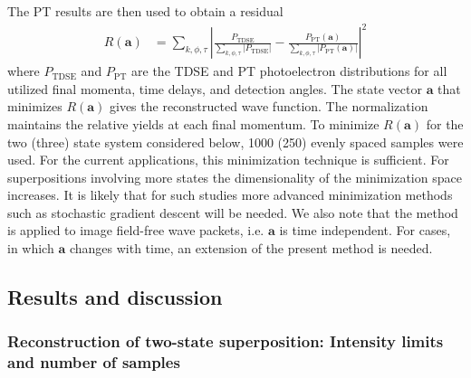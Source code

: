 The PT results are then used to obtain a residual 
%
\begin{align}
   R(\mathbf{a}) &=
   \sum_{k,\phi,\tau} \left|\frac{P_\text{TDSE}}{\sum\limits_{k,\phi,\tau}|P_\text{TDSE}|}-\frac{P_\text{PT}(\mathbf{a})}{\sum\limits_{k,\phi,\tau}|P_\text{PT}(\mathbf{a})|}\right|^2
   \label{eqn:residual}
\end{align}
%
where $P_\text{TDSE}$ and $P_\text{PT}$ are the TDSE and PT photoelectron distributions for all utilized final momenta, time delays, and detection angles. The state vector $\mathbf{a}$ that minimizes $R(\mathbf{a})$ gives the reconstructed wave function. The normalization maintains the relative yields at each final momentum. To minimize $R(\mathbf{a})$ for the two (three) state system considered below, 1000 (250) evenly spaced samples were used. 
For the current applications, this minimization technique is sufficient. For superpositions involving more states the dimensionality of the minimization space increases. It is likely that for such studies more advanced minimization methods such as stochastic gradient descent will be needed. We also note that the method is applied to image field-free wave packets, i.e. $\mathbf{a}$ is time independent. For cases, in which $\mathbf{a}$ changes with time, an extension of the present method is needed.

\subsection{\label{sub:results}Results and discussion}

\subsubsection{Reconstruction of two-state superposition: Intensity limits and number of samples}

